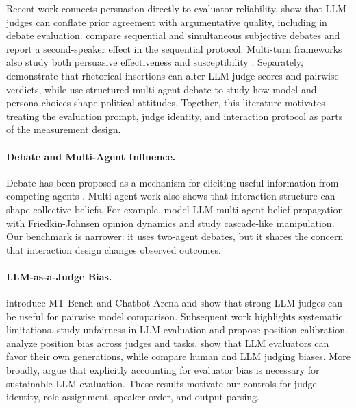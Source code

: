 \documentclass{article}
\begin{document}
Recent work connects persuasion directly to evaluator reliability. \citet{zahraei2026prior} show that LLM judges can conflate prior agreement with argumentative quality, including in debate evaluation. \citet{carro2025beliefs} compare sequential and simultaneous subjective debates and report a second-speaker effect in the sequential protocol. Multi-turn frameworks also study both persuasive effectiveness and susceptibility \citep{bozdag2025persuade}. Separately, \citet{hwang2025trick} demonstrate that rhetorical insertions can alter LLM-judge scores and pairwise verdicts, while \citet{bandaru2025political} use structured multi-agent debate to study how model and persona choices shape political attitudes. Together, this literature motivates treating the evaluation prompt, judge identity, and interaction protocol as parts of the measurement design.

\paragraph{Debate and Multi-Agent Influence.}
Debate has been proposed as a mechanism for eliciting useful information from competing agents \citep{irving2018debate}. Multi-agent work also shows that interaction structure can shape collective beliefs. For example, \citet{abedini2026stubborn} model LLM multi-agent belief propagation with Friedkin-Johnsen opinion dynamics and study cascade-like manipulation. Our benchmark is narrower: it uses two-agent debates, but it shares the concern that interaction design changes observed outcomes.

\paragraph{LLM-as-a-Judge Bias.}
\citet{zheng2023judge} introduce MT-Bench and Chatbot Arena and show that strong LLM judges can be useful for pairwise model comparison. Subsequent work highlights systematic limitations. \citet{wang2024faireval} study unfairness in LLM evaluation and propose position calibration. \citet{shi2024positionbias} analyze position bias across judges and tasks. \citet{panickssery2024selfpreference} show that LLM evaluators can favor their own generations, while \citet{chen2024judgementbias} compare human and LLM judging biases. More broadly, \citet{katoch2026accounting} argue that explicitly accounting for evaluator bias is necessary for sustainable LLM evaluation. These results motivate our controls for judge identity, role assignment, speaker order, and output parsing.
\end{document}
